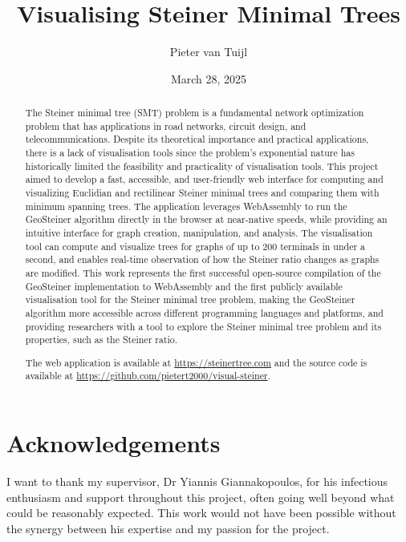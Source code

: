 \documentclass{l4proj}
\begin{document}
\title{Visualising Steiner Minimal Trees}
\author{Pieter van Tuijl}
\date{March 28, 2025}

\maketitle

\begin{abstract}
    The Steiner minimal tree (SMT) problem is a fundamental network optimization problem that has applications in road networks, circuit design, and telecommunications. Despite its theoretical importance and practical applications, there is a lack of visualisation tools since the problem's exponential nature has historically limited the feasibility and practicality of visualisation tools. This project aimed to develop a fast, accessible, and user-friendly web interface for computing and visualizing Euclidian and rectilinear Steiner minimal trees and comparing them with minimum spanning trees. The application leverages WebAssembly to run the GeoSteiner algorithm directly in the browser at near-native speeds, while providing an intuitive interface for graph creation, manipulation, and analysis. The visualisation tool can compute and visualize trees for graphs of up to 200 terminals in under a second, and enables real-time observation of how the Steiner ratio changes as graphs are modified. This work represents the first successful open-source compilation of the GeoSteiner implementation to WebAssembly and the first publicly available visualisation tool for the Steiner minimal tree problem, making the GeoSteiner algorithm more accessible across different programming languages and platforms, and providing researchers with a tool to explore the Steiner minimal tree problem and its properties, such as the Steiner ratio.

    The web application is available at \url{https://steinertree.com} and the source code is available at \url{https://github.com/pietert2000/visual-steiner}.
\end{abstract}

\chapter*{Acknowledgements}
I want to thank my supervisor, Dr Yiannis Giannakopoulos, for his infectious enthusiasm and support throughout this project, often going well beyond what could be reasonably expected. This work would not have been possible without the synergy between his expertise and my passion for the project.
\end{document}

